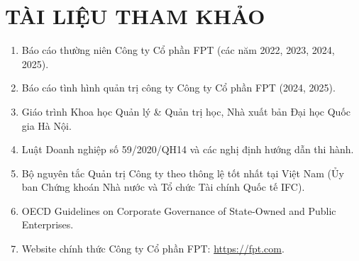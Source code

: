 \documentclass[12pt,a4paper]{article}
\begin{document}
\newpage
\tableofcontents
\newpage


\newpage

\newpage

\newpage

\newpage

\newpage

\newpage


\newpage
\section*{TÀI LIỆU THAM KHẢO}
\begin{enumerate}
    \item Báo cáo thường niên Công ty Cổ phần FPT (các năm 2022, 2023, 2024, 2025).
    \item Báo cáo tình hình quản trị công ty Công ty Cổ phần FPT (2024, 2025).
    \item Giáo trình Khoa học Quản lý \& Quản trị học, Nhà xuất bản Đại học Quốc gia Hà Nội.
    \item Luật Doanh nghiệp số 59/2020/QH14 và các nghị định hướng dẫn thi hành.
    \item Bộ nguyên tắc Quản trị Công ty theo thông lệ tốt nhất tại Việt Nam (Ủy ban Chứng khoán Nhà nước và Tổ chức Tài chính Quốc tế IFC).
    \item OECD Guidelines on Corporate Governance of State-Owned and Public Enterprises.
    \item Website chính thức Công ty Cổ phần FPT: \url{https://fpt.com}.
\end{enumerate}
\end{document}
